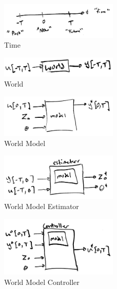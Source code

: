 \documentclass{article}
\begin{document}
    \clearpage
    \begin{figure}[h!]
        \centering
        \includegraphics[width=0.5\textwidth]{./figs/mpc/world_model_time.jpg}
        \caption{Time}
        \label{fig:world_model_time}
    \end{figure}
    \begin{figure}[h!]
        \centering
        \includegraphics[width=0.5\textwidth]{./figs/mpc/world_model_world.jpg}
        \caption{World}
        \label{fig:world_model_world}
    \end{figure}
    \begin{figure}[h!]
        \centering
        \includegraphics[width=0.5\textwidth]{./figs/mpc/world_model_model.jpg}
        \caption{World Model}
        \label{fig:world_model_model}
    \end{figure}
    \begin{figure}[h!]
        \centering
        \includegraphics[width=0.5\textwidth]{./figs/mpc/world_model_estimator.jpg}
        \caption{World Model Estimator}
        \label{fig:world_model_estimator}
    \end{figure}
    \begin{figure}[h!]
        \centering
        \includegraphics[width=0.5\textwidth]{./figs/mpc/world_model_controller.jpg}
        \caption{World Model Controller}
        \label{fig:world_model_controller}
    \end{figure}
\end{document}
